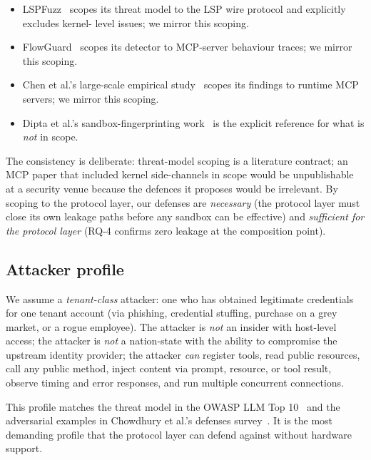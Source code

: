 \begin{itemize}
  \item LSPFuzz~\cite{zhu_2025_lspfuzz} scopes its threat model to
        the LSP wire protocol and explicitly excludes kernel-
        level issues; we mirror this scoping.
  \item FlowGuard~\cite{an_2026_flowguard} scopes its detector to
        MCP-server behaviour traces; we mirror this scoping.
  \item Chen et al.'s large-scale empirical study~\cite{chen_2026_mcp_security}
        scopes its findings to runtime MCP servers;
        we mirror this scoping.
  \item Dipta et al.'s sandbox-fingerprinting work~\cite{dipta_2024_sandbox}
        is the explicit reference for what is \emph{not} in
        scope.
\end{itemize}

The consistency is deliberate: threat-model scoping is a
literature contract; an MCP paper that included kernel
side-channels in scope would be unpublishable at a security
venue because the defences it proposes would be irrelevant.
By scoping to the protocol layer, our defenses are
\emph{necessary} (the protocol layer must close its own
leakage paths before any sandbox can be effective) and
\emph{sufficient for the protocol layer} (RQ-4 confirms
zero leakage at the composition point).

\subsection{Attacker profile}

We assume a \emph{tenant-class} attacker: one who has obtained
legitimate credentials for one tenant account (via phishing,
credential stuffing, purchase on a grey market, or a rogue
employee). The attacker is \emph{not} an insider with host-level
access; the attacker is \emph{not} a nation-state with the
ability to compromise the upstream identity provider; the
attacker \emph{can} register tools, read public resources, call
any public method, inject content via prompt, resource, or
tool result, observe timing and error responses, and run
multiple concurrent connections.

This profile matches the threat model in the OWASP LLM Top
10~\cite{owasp_llm_top10_v11} and the adversarial examples in
Chowdhury et al.'s defenses survey~\cite{chowdhury_2024_defenses}.
It is the most demanding profile that the protocol layer can
defend against without hardware support.